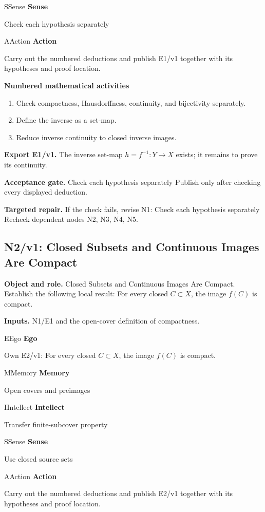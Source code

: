 \documentclass[preprint,12pt,aps,pra,showkeys,amsmath,amssymb,superscriptaddress,floatfix]{revtex4-2}
\theoremstyle{definition}
\theoremstyle{remark}
\newcommand{\mmfaculty}[3]{%
 \begin{mmfacultybox}{#1}{#2}
 {\sffamily\bfseries\color{MMBlue}#2}\par\smallskip #3
 \end{mmfacultybox}}
\newcommand{\field}[2]{\par\smallskip\noindent\textbf{#1.} #2\par}
\begin{document}
\mmfaculty{S}{Sense}{Check each hypothesis separately}

\mmfaculty{A}{Action}{Carry out the numbered deductions and publish E1/v1 together with its
hypotheses and proof location.}

\smallskip\noindent\textbf{Numbered mathematical activities}

\begin{enumerate}[label=N1.\arabic*,leftmargin=3.4em]

\item Check compactness, Hausdorffness, continuity, and bijectivity
separately.

\item Define the inverse as a set-map.

\item Reduce inverse continuity to closed inverse images.

\end{enumerate}

\field{Export E1/v1}{The inverse set-map \(h=f^{-1}:Y\to X\) exists; it remains to prove its
continuity.}

\field{Acceptance gate}{Check each hypothesis separately Publish only after checking every
displayed deduction.}

\field{Targeted repair}{If the check fails, revise N1: Check each hypothesis separately Recheck
dependent nodes N2, N3, N4, N5.}

\clearpage

\subsection{N2/v1: Closed Subsets and Continuous Images Are Compact}

\field{Object and role}{Closed Subsets and Continuous Images Are Compact. Establish the
following local result: For every closed \(C\subset X\), the image
\(f(C)\) is compact.}

\field{Inputs}{N1/E1 and the open-cover definition of compactness.}

\mmfaculty{E}{Ego}{Own E2/v1: For every closed \(C\subset X\), the image \(f(C)\) is
compact.}

\mmfaculty{M}{Memory}{Open covers and preimages}

\mmfaculty{I}{Intellect}{Transfer finite-subcover property}

\mmfaculty{S}{Sense}{Use closed source sets}

\mmfaculty{A}{Action}{Carry out the numbered deductions and publish E2/v1 together with its
hypotheses and proof location.}
\end{document}
